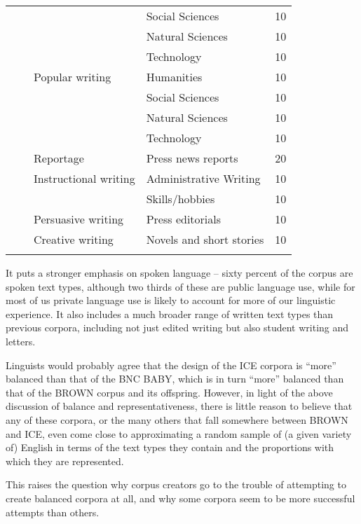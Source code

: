 \begin{table}
{\begin{tabular}{llllr}
   &      &      &   Social Sciences   &   10 \\
   &      &      &   Natural Sciences   &   10 \\
   &      &      &   Technology   &   10 \\
   &      &   Popular writing   &   Humanities   &   10 \\
   &      &      &   Social Sciences   &   10 \\
   &      &      &   Natural Sciences   &   10 \\
   &      &      &   Technology   &   10 \\
   &      &   Reportage   &   Press news reports   &   20 \\
   &      &   Instructional writing   &   Administrative Writing   &   10 \\
   &      &      &   Skills/hobbies   &   10 \\
   &      &   Persuasive writing   &   Press editorials   &   10 \\
   &      &   Creative writing   &   Novels and short stories   &   10 \\
  \lspbottomrule
 \end{tabular}}
\end{table}

It puts a stronger emphasis on spoken language -- sixty percent of the corpus are spoken text types, although two thirds of these are public language use, while for most of us private language use is likely to account for more of our linguistic experience. It also includes a much broader range of written text types than previous corpora, including not just edited writing but also student writing and letters.

Linguists would probably agree that the design of the ICE corpora is ``more'' balanced than that of the BNC BABY, which is in turn ``more'' balanced than that of the BROWN corpus and its offspring. However, in light of the above discussion of balance and representativeness, there is little reason to believe that any of these corpora, or the many others that fall somewhere between BROWN and ICE, even come close to approximating a random sample of (a given variety of) English in terms of the text types they contain and the proportions with which they are represented.

This raises the question why corpus creators go to the trouble of attempting to create balanced corpora at all, and why some corpora seem to be more successful attempts than others.


